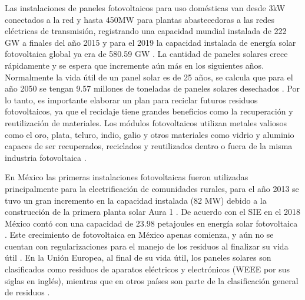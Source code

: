 Las instalaciones de paneles fotovoltaicos para uso domésticas van desde 3kW conectados a la red y hasta 450MW para plantas abastecedoras a las redes eléctricas de transmisión, registrando una capacidad mundial instalada de 222 GW  a finales del año 2015 \citep{Pro2017}  y para el 2019 la capacidad instalada de energía solar fotovoltaica global ya era de 580.59 GW \citep{IRENA2019}. La cantidad de paneles solares crece rápidamente y se espera que incremente aún más en los siguientes años. Normalmente la vida útil de un panel solar es de 25 años, se calcula que para el año 2050 se tengan 9.57 millones de toneladas de paneles solares desechados \citep{Xu2012}. Por lo tanto, es importante elaborar un plan para reciclar futuros residuos fotovoltaicos, ya que el reciclaje tiene grandes beneficios como la recuperación y reutilización de materiales. Los módulos fotovoltaicos utilizan metales valiosos como el oro, plata, teluro, indio, galio y otros materiales como vidrio y aluminio capaces de ser recuperados, reciclados y reutilizados dentro o fuera de la misma industria fotovoltaica \citep{Dominguez2017}.

En México las primeras instalaciones fotovoltaicas fueron utilizadas principalmente para la electrificación de comunidades rurales, para el año 2013 se tuvo un gran incremento en la capacidad instalada (82 MW) debido a la construcción de la primera planta solar Aura 1 \citep{Dominguez2017}. De acuerdo con el SIE en el 2018 México contó con una capacidad de 23.98 petajoules en energía solar fotovoltaica \citep{SIE2019}. Este crecimiento de fotovoltaica en México apenas comienza, y aún no se cuentan con regularizaciones para el manejo de los residuos al finalizar su vida útil \citep{Dominguez2017}. En la Unión Europea, al final de su vida útil, los paneles solares son clasificados como residuos de aparatos eléctricos y electrónicos (WEEE por sus siglas en inglés), mientras que en otros países son parte de la clasificación general de residuos \citep{Azeumo2019}.

